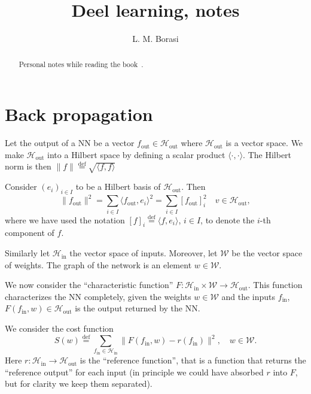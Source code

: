 \documentclass[10pt, a4paper]{article}
\title{Deel learning, notes}
\author{L. M. Borasi}
\theoremstyle{plain}
\theoremstyle{definition}
\theoremstyle{definition}
\theoremstyle{definition}
\theoremstyle{definition}
\theoremstyle{definition}
\theoremstyle{definition}
\theoremstyle{definition}
\theoremstyle{remark}
\theoremstyle{remark}
\theoremstyle{rudin-style-generic}
\theoremstyle{rudin-style-generic*}
\theoremstyle{rudin-style-theorem}
\newcommand{\deq}{\stackrel{\mathrm{def}}{=}}
\begin{document}
\maketitle
\begin{abstract}
	Personal notes while reading the book~\cite{goodfellowDeepLearning2016}.
\end{abstract}
\tableofcontents

\section{Back propagation}

Let the output of a NN be a vector $f_{\text{out}}\in \mathcal H_{\text{out}}$ 
where $\mathcal H_{\text{out}}$ is a vector space.
We make $\mathcal H_{\text{out}}$ into a Hilbert space by defining a scalar product $\langle\cdot,\cdot\rangle$.
The Hilbert norm is then $\|f\|\deq \sqrt{\langle f,f\rangle}$ 


Consider $(e_i)_{i\in I}$ to be a Hilbert basis of $\mathcal H_{\text{out}}$.
Then
\begin{equation*}
	\| f_{\text{out}} \|^2 = \sum_{i\in I} \langle f_{\text{out}}, e_i \rangle^2 = \sum_{i\in I}  [f_{\text{out}}]_i^2 
	\quad v\in\mathcal H_{\text{out}}
	,
\end{equation*}
where we have used the notation $[f]_i \deq \langle f, e_i\rangle$, $i\in I$, to denote the $i$-th component of $f$.



Similarly let $\mathcal H_{\text{in}}$ the vector space of inputs.
Moreover, let $\mathcal W$ be the vector space of weights. The graph of the network is an element $w\in\mathcal W$.

We now consider the ``characteristic function''  $F:\mathcal H_{\text{in}} \times \mathcal W \rightarrow \mathcal H_{\text{out}}$.
This function characterizes the NN completely, given the weights $w\in\mathcal W$ and the inputs $f_{\text{in}}$,
$F(f_{\text{in}}, w)\in\mathcal H_{\text{out}}$ is the output returned by the NN.

We consider the cost function
\begin{equation*}
	S(w) \deq \sum_{f_{\text{in}}\in\mathcal H_{\text{in}}} \| F(f_{\text{in}}, w) - r(f_{\text{in}}) \|^2,
	\quad w\in\mathcal W
	.
\end{equation*}
Here $r:\mathcal H_{\text{in}}\rightarrow\mathcal H_{\text{out}}$ is the ``reference function'',
that is a function that returns the ``reference output'' for each input (in principle we could have absorbed $r$ into $F$,
but for clarity we keep them separated).
\end{document}
